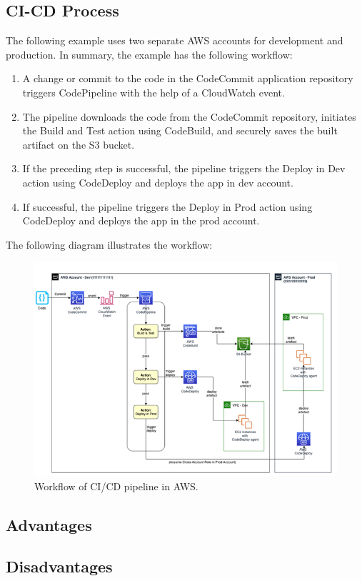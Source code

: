 %
\subsection{CI-CD Process}
%
The following example uses two separate AWS accounts for development and production.
In summary, the example has the following workflow:

\begin{enumerate}
    \item A change or commit to the code in the CodeCommit application repository triggers CodePipeline with the help of a CloudWatch event.
    
    \item The pipeline downloads the code from the CodeCommit repository, initiates the Build and Test action using CodeBuild, and securely saves the built artifact on the S3 bucket.
    
    \item If the preceding step is successful, the pipeline triggers the Deploy in Dev action using CodeDeploy and deploys the app in dev account.
    
    \item If successful, the pipeline triggers the Deploy in Prod action using CodeDeploy and deploys the app in the prod account.
\end{enumerate}

The following diagram illustrates the workflow:

\begin{figure}[h]
    \centering
    \includegraphics[width=\textwidth]{images/aws_cicd.png}
    \caption{Workflow of CI/CD pipeline in AWS.}
    \label{fig:aws_cicd}
\end{figure}



%
\subsection{Advantages}
%
\subsection{Disadvantages}